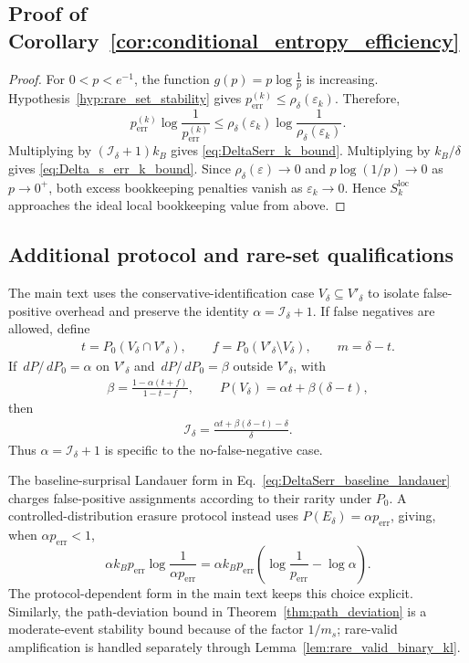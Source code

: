 \documentclass[
  aps,
  prresearch,
  reprint,
  amsmath,
  amssymb,
  superscriptaddress,
  nofootinbib,
  longbibliography
]{revtex4-2}
\def\EQSP{3pt}
\newcommand{\cgather}[2][\EQSP]{\begingroup\setlength\abovedisplayskip{#1}\setlength\belowdisplayskip{#1}\begin{gather} #2 \end{gather}\endgroup\noindent}
\newcommand{\calI}{\mathcal{I}}
\newcommand{\dd}{\,d}
\begin{document}
\subsection{Proof of Corollary~\ref{cor:conditional_entropy_efficiency}}
\begin{proof}
For \(0<p<e^{-1}\), the function
$    g(p)=p\log\frac{1}{p}$ is increasing. Hypothesis~\ref{hyp:rare_set_stability} gives
\(p_{\mathrm{err}}^{(k)}\leq \rho_\delta(\varepsilon_k)\). Therefore,
\[
    p_{\mathrm{err}}^{(k)}
    \log\frac{1}{p_{\mathrm{err}}^{(k)}}
    \leq
    \rho_\delta(\varepsilon_k)
    \log\frac{1}{\rho_\delta(\varepsilon_k)}.
\]
Multiplying by \((\calI_\delta+1)k_B\) gives
\eqref{eq:DeltaSerr_k_bound}. Multiplying by \(k_B/\delta\) gives
\eqref{eq:Delta_s_err_k_bound}. Since
\(\rho_\delta(\varepsilon)\to0\) and \(p\log(1/p)\to0\) as
\(p\to0^+\), both excess bookkeeping penalties vanish as
\(\varepsilon_k\to0\). Hence \(S_k^{\mathrm{loc}}\) approaches the ideal
local bookkeeping value from above.
\end{proof}

\subsection{Additional protocol and rare-set qualifications}

The main text uses the conservative-identification case \(V_\delta\subseteq V'_\delta\) to isolate false-positive overhead and preserve the identity \(\alpha=\calI_\delta+1\). If false negatives are allowed, define
\cgather{
    t=P_0(V_\delta\cap V'_\delta),\qquad
    f=P_0(V'_\delta\setminus V_\delta),
    \qquad
    m=\delta-t.
}
If \(\dd P/\dd P_0=\alpha\) on \(V'_\delta\) and \(\dd P/\dd P_0=\beta\) outside \(V'_\delta\), with
\cgather{
    \beta=\frac{1-\alpha(t+f)}{1-t-f},
    \qquad
    P(V_\delta)=\alpha t+\beta(\delta-t),
}
then
\cgather{
    \calI_\delta=\frac{\alpha t+\beta(\delta-t)-\delta}{\delta}.
}
Thus \(\alpha=\calI_\delta+1\) is specific to the no-false-negative case.

The baseline-surprisal Landauer form in Eq.~\eqref{eq:DeltaSerr_baseline_landauer} charges false-positive assignments according to their rarity under \(P_0\). A controlled-distribution erasure protocol instead uses \(P(E_\delta)=\alpha p_{\mathrm{err}}\), giving, when \(\alpha p_{\mathrm{err}}<1\),
\[
    \alpha k_Bp_{\mathrm{err}}
    \log\frac{1}{\alpha p_{\mathrm{err}}}
    =
    \alpha k_Bp_{\mathrm{err}}
    \left(\log\frac{1}{p_{\mathrm{err}}}-\log\alpha\right).
\]
The protocol-dependent form in the main text keeps this choice explicit. Similarly, the path-deviation bound in Theorem~\ref{thm:path_deviation} is a moderate-event stability bound because of the factor \(1/m_s\); rare-valid amplification is handled separately through Lemma~\ref{lem:rare_valid_binary_kl}.
\end{document}
